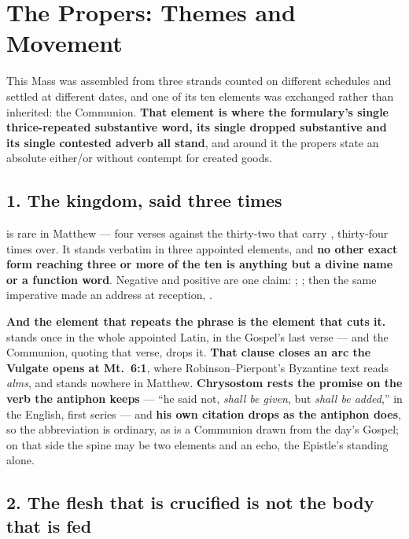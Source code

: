 \sectionguard
\section*{The Propers: Themes and Movement}
\label{triptych:brief-synthesis:start}

This Mass was assembled from three strands counted on different schedules and
settled at different dates, and one of its ten elements was exchanged rather
than inherited: the Communion. \textbf{That element is where the
formulary's single thrice-repeated substantive word, its single
dropped substantive and its single contested adverb all stand}, and around it the
propers state an absolute either/or without contempt for created goods.

\subsection*{1. The kingdom, said three times}

 is rare in Matthew --- four verses against the thirty-two
that carry , thirty-four times over. It stands
verbatim in three appointed elements, and \textbf{no other exact form reaching
three or more of the ten is anything but a divine name or a function word}.
Negative and positive are one claim: ; ; then the same
imperative made an address at reception, .

\textbf{And the element that repeats the phrase is the element that cuts it.}
 stands once in the whole appointed Latin, in the Gospel's last
verse --- and the Communion, quoting that verse, drops it. \textbf{That clause
closes an arc the Vulgate opens at Mt.\ 6:1}, where Robinson--Pierpont's
Byzantine text reads \emph{alms}, and  stands nowhere in
Matthew. \textbf{Chrysostom rests the promise on the verb the antiphon keeps} ---
``he said not, \emph{shall be given}, but \emph{shall be added},'' in the
 English, first series --- and
\textbf{his own citation drops  as the antiphon does},
so the abbreviation is ordinary, as is a Communion drawn from the day's Gospel;
on that side the spine may be two elements and an echo, the Epistle's standing
alone.

\subsection*{2. The flesh that is crucified is not the body that is fed}

